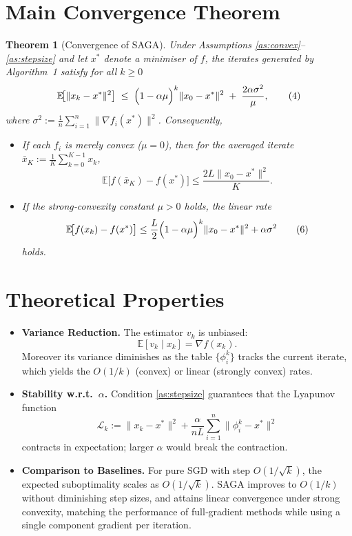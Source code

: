 \documentclass[11pt]{article}
\newtheorem{theorem}{Theorem}
\newcommand{\E}{\mathbb{E}}
\begin{document}
\section*{Main Convergence Theorem}
\begin{theorem}[Convergence of SAGA]\label{thm:conv}
Under Assumptions \ref{as:convex}–\ref{as:stepsize} and
let $x^{*}$ denote a minimiser of $f$, the iterates generated by
Algorithm~1 satisfy for all $k\ge0$
\[
\E\!\bigl[\|x_{k}-x^{*}\|^{2}\bigr]\;\le\;
\Bigl(1-\alpha\mu\Bigr)^{k}\|x_{0}-x^{*}\|^{2}
\;+\;\frac{2\alpha\sigma^{2}}{\mu},
\tag{4}
\]
where $\sigma^{2}:=\frac{1}{n}\sum_{i=1}^{n}\|\nabla f_i(x^{*})\|^{2}$.
Consequently,
\begin{itemize}
\item If each $f_i$ is merely convex ($\mu=0$), then for the averaged iterate 
$\bar{x}_{K}:=\frac1K\sum_{k=0}^{K-1}x_{k}$,
\[
\E\!\bigl[f(\bar{x}_{K})-f(x^{*})\bigr]\le\frac{2L\|x_{0}-x^{*}\|^{2}}{K}.
\tag{5}
\]
\item If the strong‑convexity constant $\mu>0$ holds, the linear rate
\[
\E\!\bigl[f(x_{k})-f(x^{*})\bigr]\le
\frac{L}{2}\Bigl(1-\alpha\mu\Bigr)^{k}\|x_{0}-x^{*}\|^{2}+ \alpha\sigma^{2}
\tag{6}
\]
holds.
\end{itemize}
\end{theorem}

\section*{Theoretical Properties}
\begin{itemize}
\item \textbf{Variance Reduction.} The estimator $v_{k}$ is unbiased:
\[
\E[v_{k}\mid x_{k}]=\nabla f(x_{k}).
\]
Moreover its variance diminishes as the table $\{\phi_i^{k}\}$ tracks the current iterate,
which yields the $O(1/k)$ (convex) or linear (strongly convex) rates.
\item \textbf{Stability w.r.t.\ $\alpha$.}
Condition \eqref{as:stepsize} guarantees that the Lyapunov function
\[
\mathcal{L}_{k}:=\|x_{k}-x^{*}\|^{2}
+\frac{\alpha}{nL}\sum_{i=1}^{n}\|\phi^{k}_{i}-x^{*}\|^{2}
\]
contracts in expectation; larger $\alpha$ would break the contraction.
\item \textbf{Comparison to Baselines.}
For pure SGD with step $O(1/\sqrt{k})$, the expected suboptimality scales as $O(1/\sqrt{k})$.
SAGA improves to $O(1/k)$ without diminishing step sizes, and attains
linear convergence under strong convexity, matching the performance of
full‑gradient methods while using a single component gradient per iteration.
\end{itemize}
\end{document}
